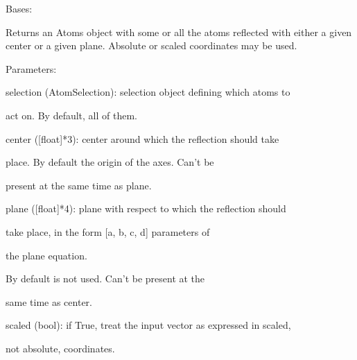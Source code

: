 \documentclass[letterpaper,10pt,english]{sphinxmanual}
\begin{document}
\begin{fulllineitems}
\label{doctree/soprano.properties.transform.transform:soprano.properties.transform.transform.Mirror}
Bases: {\hyperref[doctree/soprano.properties.atomsproperty:soprano.properties.atomsproperty.AtomsProperty]{\emph{}}}

Returns an Atoms object with some or all the atoms reflected with either a
given center or a given plane. Absolute or scaled coordinates may be used.

\begin{DUlineblock}{0em}
\item[] Parameters:
\item[]
\begin{DUlineblock}{\DUlineblockindent}
\item[] selection (AtomSelection): selection object defining which atoms to
\item[]
\begin{DUlineblock}{\DUlineblockindent}
\item[] act on. By default, all of them.
\end{DUlineblock}
\item[] center ({[}float{]}*3): center around which the reflection should take
\item[]
\begin{DUlineblock}{\DUlineblockindent}
\item[] place. By default the origin of the axes. Can't be
\item[] present at the same time as plane.
\end{DUlineblock}
\item[] plane ({[}float{]}*4): plane with respect to which the reflection should
\item[]
\begin{DUlineblock}{\DUlineblockindent}
\item[] take place, in the form {[}a, b, c, d{]} parameters of
\item[] the plane equation.
\item[] By default is not used. Can't be present at the
\item[] same time as center.
\end{DUlineblock}
\item[] scaled (bool): if True, treat the input vector as expressed in scaled,
\item[]
\begin{DUlineblock}{\DUlineblockindent}
\item[] not absolute, coordinates.
\end{DUlineblock}
\end{DUlineblock}
\end{DUlineblock}


\end{fulllineitems}
\end{document}
